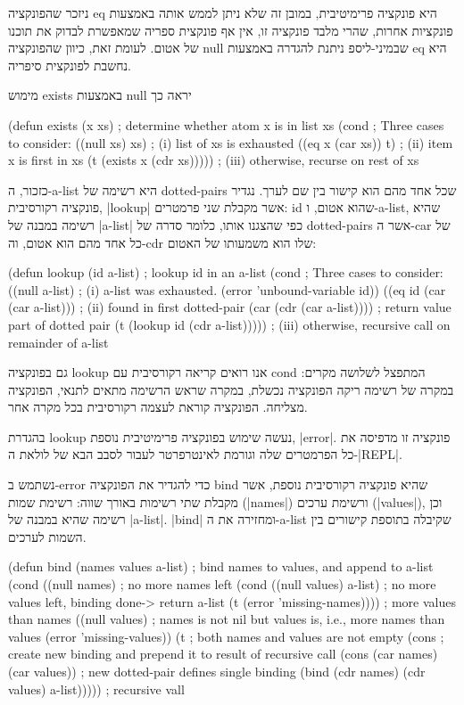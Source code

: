 ניזכר שהפונקציה eq היא פונקציה פרימיטיבית, במובן זה שלא ניתן לממש אותה באמצעות
פונקציות אחרות, שהרי מלבד פונקציה זו, אין אף פונקצית ספריה שמאפשרת לבדוק את
תוכנו של אטום. לעומת זאת, כיוון שהפונקציה null שבמיני-ליספ ניתנת להגדרה
באמצעות eq היא נחשבת לפונקצית סיפריה.

מימוש exists באמצעות null יראה כך
\begin{KERNEL}
(defun exists (x xs) ; determine whether atom x is in list xs
  (cond ; Three cases to consider:
    ((null xs) xs) ; (i) list of xs is exhausted
    ((eq x (car xs)) t) ; (ii) item x is first in xs
    (t (exists x (cdr xs))))) ; (iii) otherwise, recurse on rest of xs
\end{KERNEL}

כזכור, ה-a-list היא רשימה של dotted-pairs שכל אחד מהם הוא קישור בין שם לערך.
נגדיר פונקציה רקורסיבית, \E|lookup| אשר מקבלת שני פרמטרים: id שהוא אטום,
ו-a-list, שהיא רשימה במבנה של \E|a-list| כפי שהצגנו אותו, כלומר סדרה של
dotted-pairs אשר ה-car של כל אחד מהם הוא אטום, וה-cdr שלו הוא משמעותו של האטום:
\begin{KERNEL}
(defun lookup (id a-list) ; lookup id in an a-list
  (cond ; Three cases to consider:
    ((null a-list) ; (i) a-list was exhausted.
      (error 'unbound-variable id))
    ((eq id (car (car a-list))) ; (ii) found in first dotted-pair
      (car (cdr (car a-list)))) ; return value part of dotted pair
    (t (lookup id (cdr a-list))))) ; (iii) otherwise, recursive call on remainder of a-list
\end{KERNEL}
גם בפונקציה lookup אנו רואים קריאה רקורסיבית עם cond המתפצל לשלושה מקרים: במקרה
של רשימה ריקה הפונקציה נכשלת, במקרה שראש הרשימה מתאים לתנאי, הפונקציה מצליחה.
הפונקציה קוראת לעצמה רקורסיבית בכל מקרה אחר.

בהגדרת lookup נעשה שימוש בפונקציה פרימיטיבית נוספת, \E|error|. פונקציה זו
מדפיסה את כל הפרמטרים שלה וגורמת לאינטרפרטר לעבור לסבב הבא של לולאת ה-\E|REPL|.

נשתמש ב-error כדי להגדיר את הפונקציה bind שהיא פונקציה רקורסיבית נוספת, אשר
מקבלת שתי רשימות באורך שווה: רשימת שמות (\E|names|) ורשימת ערכים (\E|values|),
וכן רשימה שהיא במבנה של \E|a-list|. \E|bind| ומחזירה את ה-a-list
שקיבלה בתוספת קישורים בין השמות לערכים.

\begin{KERNEL}
(defun bind (names values a-list) ; bind names to values, and append to a-list
  (cond ((null names) ; no more names left
        (cond ((null values) a-list) ; no more values left, binding done-> return a-list
              (t (error 'missing-names)))) ; more values than names
        ((null values) ; names is not nil but values is, i.e., more names than values
          (error 'missing-values))
        (t ; both names and values are not empty
          (cons ; create new binding and prepend it to result of recursive call
            (cons (car names) (car values)) ; new dotted-pair defines single binding
            (bind (cdr names) (cdr values) a-list))))) ; recursive vall
\end{KERNEL}

